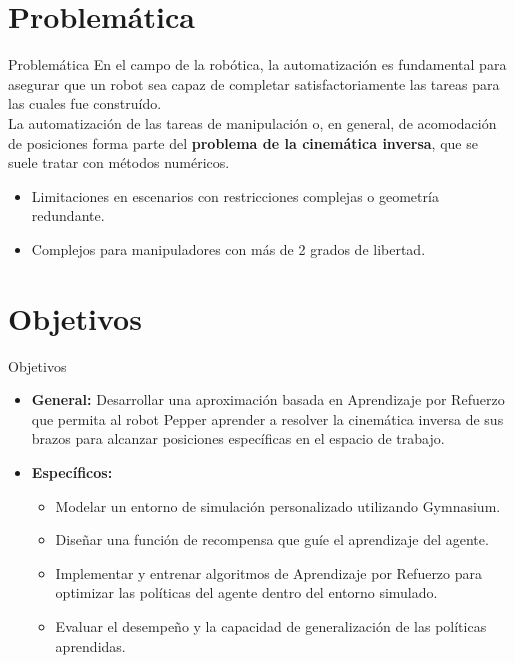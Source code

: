\documentclass[spanish,10pt]{beamer}
\begin{document}
	\section{Problemática}
	\begin{frame}{Problemática}
		En el campo de la robótica, la automatización es fundamental para asegurar que un robot sea capaz de completar satisfactoriamente las tareas para las cuales fue construído.\\[2em]
		
		La automatización de las tareas de manipulación o, en general, de acomodación de posiciones forma parte del \textbf{problema de la cinemática inversa}, que se suele tratar con métodos numéricos.\\[2em]
		
		\begin{itemize}
			\item Limitaciones en escenarios con restricciones complejas o geometría redundante.
			\item Complejos para manipuladores con más de 2 grados de libertad.
		\end{itemize}
	\end{frame}
	
	\section{Objetivos}
	\begin{frame}{Objetivos}
		\begin{itemize}
			\item 
			\textbf{General:} Desarrollar una aproximación basada en Aprendizaje por Refuerzo que permita al robot Pepper aprender a resolver la cinemática inversa de sus brazos para alcanzar posiciones específicas en el espacio de trabajo.
			\item 
			\textbf{Específicos:}
			\begin{itemize}
				\item Modelar un entorno de simulación personalizado utilizando Gymnasium.
				\item Diseñar una función de recompensa que guíe el aprendizaje del agente.
				\item Implementar y entrenar algoritmos de Aprendizaje por Refuerzo para optimizar las políticas del agente dentro del entorno simulado.
				\item Evaluar el desempeño y la capacidad de generalización de las políticas aprendidas.
			\end{itemize}
		\end{itemize}
	\end{frame}
	
\end{document}
